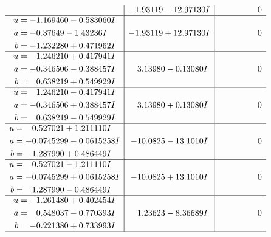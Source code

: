 \documentclass[1p]{elsarticle_modified}
\theoremstyle{definition}
\begin{document}
$$\begin{array}{c|c|c}
 & -1.93119 - 12.97130 I & \phantom{-0.000000 } 0 \\ \hline\begin{aligned}
u &= -1.169460 - 0.583060 I \\
a &= -0.37649 - 1.43236 I \\
b &= -1.232280 + 0.471962 I\end{aligned}
 & -1.93119 + 12.97130 I & \phantom{-0.000000 } 0 \\ \hline\begin{aligned}
u &= \phantom{-}1.246210 + 0.417941 I \\
a &= -0.346506 - 0.388457 I \\
b &= \phantom{-}0.638219 + 0.549929 I\end{aligned}
 & \phantom{-}3.13980 - 0.13080 I & \phantom{-0.000000 } 0 \\ \hline\begin{aligned}
u &= \phantom{-}1.246210 - 0.417941 I \\
a &= -0.346506 + 0.388457 I \\
b &= \phantom{-}0.638219 - 0.549929 I\end{aligned}
 & \phantom{-}3.13980 + 0.13080 I & \phantom{-0.000000 } 0 \\ \hline\begin{aligned}
u &= \phantom{-}0.527021 + 1.211110 I \\
a &= -0.0745299 - 0.0615258 I \\
b &= \phantom{-}1.287990 + 0.486449 I\end{aligned}
 & -10.0825 - 13.1010 I & \phantom{-0.000000 } 0 \\ \hline\begin{aligned}
u &= \phantom{-}0.527021 - 1.211110 I \\
a &= -0.0745299 + 0.0615258 I \\
b &= \phantom{-}1.287990 - 0.486449 I\end{aligned}
 & -10.0825 + 13.1010 I & \phantom{-0.000000 } 0 \\ \hline\begin{aligned}
u &= -1.261480 + 0.402454 I \\
a &= \phantom{-}0.548037 - 0.770393 I \\
b &= -0.221380 + 0.733993 I\end{aligned}
 & \phantom{-}1.23623 - 8.36689 I & \phantom{-0.000000 } 0\\
 \hline 
 \end{array}$$\newpage$$\begin{array}{c|c|c}  

\end{array}$$
\end{document}
